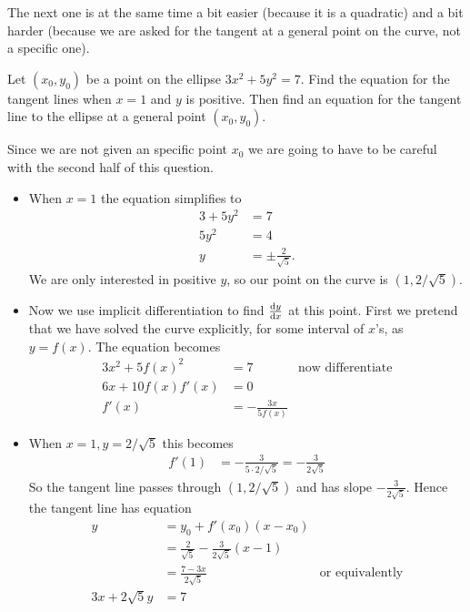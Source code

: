 The next one is at the same time a bit easier (because it is a quadratic) and a
bit harder (because we are asked for the tangent at a general point on the curve, not a
specific one).
\begin{eg}\label{eg:DIFFimpldiffA}
Let $(x_0,y_0)$ be a point on the ellipse $3x^2+5y^2=7$. Find the equation for
the tangent lines when $x=1$ and $y$ is positive. Then find an equation
for the tangent line to the ellipse at a general point $(x_0,y_0)$.

Since we are not given an specific point $x_0$ we are going to have to be
careful with the second half of this question.
\begin{itemize}
 \item When $x=1$ the equation simplifies to
\begin{align*}
  3 + 5y^2 &= 7 \\
  5y^2 &= 4 \\
  y &= \pm \frac{2}{\sqrt{5}}.
\end{align*}
We are only interested in positive $y$, so our point on the curve
is $(1,2/\sqrt{5})$.

\item Now we use implicit differentiation to find $\diff{y}{x}$ at
this point. First we pretend that we have solved the curve explicitly, for some interval
of $x$'s, as $y=f(x)$. The equation becomes
\begin{align*}
  3x^2 + 5f(x)^2 &= 7 & \text{now differentiate} \\
  6x + 10 f(x) f'(x) &= 0 \\
  f'(x) &= - \frac{3x}{5f(x)}
\end{align*}

\item When $x=1, y= 2/\sqrt{5}$ this becomes
\begin{align*}
  f'(1) &= - \frac{3}{5 \cdot 2/\sqrt{5}} = - \frac{3}{2\sqrt{5}}
\end{align*}
So the tangent line passes through $(1,2/\sqrt{5})$ and has slope $-
\frac{3}{2\sqrt{5}}$. Hence the tangent line has equation
\begin{align*}
  y &=y_0+f'(x_0)(x-x_0) \\
    &= \frac{2}{\sqrt{5}} - \frac{3}{2\sqrt{5}} (x-1) \\
  &= \frac{7 - 3x}{2\sqrt{5}} & \text{or equivalently} \\
  3x + 2\sqrt{5} y&= 7
\end{align*}
\end{itemize}


\end{eg}
